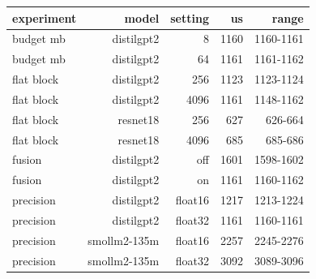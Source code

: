 \begin{tabular}{lrrrr}
\toprule
experiment & model & setting & us & range \\
\midrule
budget mb & distilgpt2 & 8 & 1160 & 1160-1161 \\
budget mb & distilgpt2 & 64 & 1161 & 1161-1162 \\
flat block & distilgpt2 & 256 & 1123 & 1123-1124 \\
flat block & distilgpt2 & 4096 & 1161 & 1148-1162 \\
flat block & resnet18 & 256 & 627 & 626-664 \\
flat block & resnet18 & 4096 & 685 & 685-686 \\
fusion & distilgpt2 & off & 1601 & 1598-1602 \\
fusion & distilgpt2 & on & 1161 & 1160-1162 \\
precision & distilgpt2 & float16 & 1217 & 1213-1224 \\
precision & distilgpt2 & float32 & 1161 & 1160-1161 \\
precision & smollm2-135m & float16 & 2257 & 2245-2276 \\
precision & smollm2-135m & float32 & 3092 & 3089-3096 \\
\bottomrule
\end{tabular}
